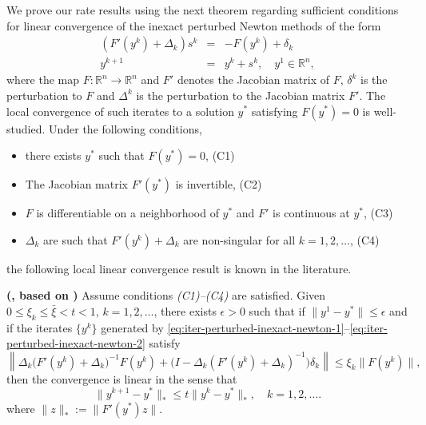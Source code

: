 \documentclass[final,numbook]{svjour3}
\begin{document}
We prove our rate results using the next theorem regarding sufficient conditions for linear convergence of the inexact perturbed Newton methods of the form
\begin{eqnarray}\label{eq:iter-perturbed-inexact-newton-1}
	(F'(y^k) + \Delta_k)s^k &=& -F(y^k) +\delta_k \\
	y^{k+1} &=& y^k + s^k, \quad y^1 \in {\mathbb R}^n, \label{eq:iter-perturbed-inexact-newton-2}
\end{eqnarray}
where the map $F :  {\mathbb R}^n \to {\mathbb R}^n$ and $F'$ denotes the Jacobian matrix of $F$, $\delta^k$ is the perturbation to $F$ and $\Delta^k$ is the perturbation to the Jacobian matrix $F'$. The local convergence of such iterates to a solution $y^*$ satisfying $F(y^*)=0$ is well-studied. Under the following conditions, 
\begin{itemize}
    \item  there exists $y^*$ such that $F(y^*)=0$, \hfill (C1)	
	\item The Jacobian matrix $F'(y^*)$ is invertible, \hfill (C2)
	\item $F$ is differentiable on a neighborhood of $y^*$ and $F'$ is continuous at $y^*$, \hfill (C3)
	\item $\Delta_k$ are such that $F'(y^k) + \Delta_k$ are non-singular for all $k=1,2,\dots$, \hfill (C4)
\end{itemize}
the following local linear convergence result is known in the literature.
\begin{theorem}\label{thm-lin-conv-newton-method} \textbf{(\cite[Theorem 2.2]{Catinas2001Jota}, based on \cite{DemboEisenNewton82})} Assume conditions \emph{(C1)--(C4)} are satisfied. Given $0\leq \xi_k \leq \bar{\xi}<t<1$, $k=1,2,\dots$, there exists $\epsilon>0$ such that if $\| y^1 - y^*\|\leq \epsilon$  and if the iterates $\{y^k\}$ generated by \eqref{eq:iter-perturbed-inexact-newton-1}--\eqref{eq:iter-perturbed-inexact-newton-2} satisfy 
$$ \left\| \Delta_k \bigg( F'(y^k)+\Delta_k \bigg)^{-1} F(y^k) + 
  \bigg( I - \Delta_k ( F'(y^k) + \Delta_k )^{-1} 
  \bigg) \delta_k  \right\| \leq \xi_k \| F(y^k) \|,
$$ 
then the convergence is linear in the sense that 
 $$ \| y^{k+1} - y^* \|_* \leq t \| y^k - y^*\|_*, \quad k=1,2,\dots. $$
 where $\| z \|_* := \| F'(y^*) z \|$.
\end{theorem}
\end{document}
